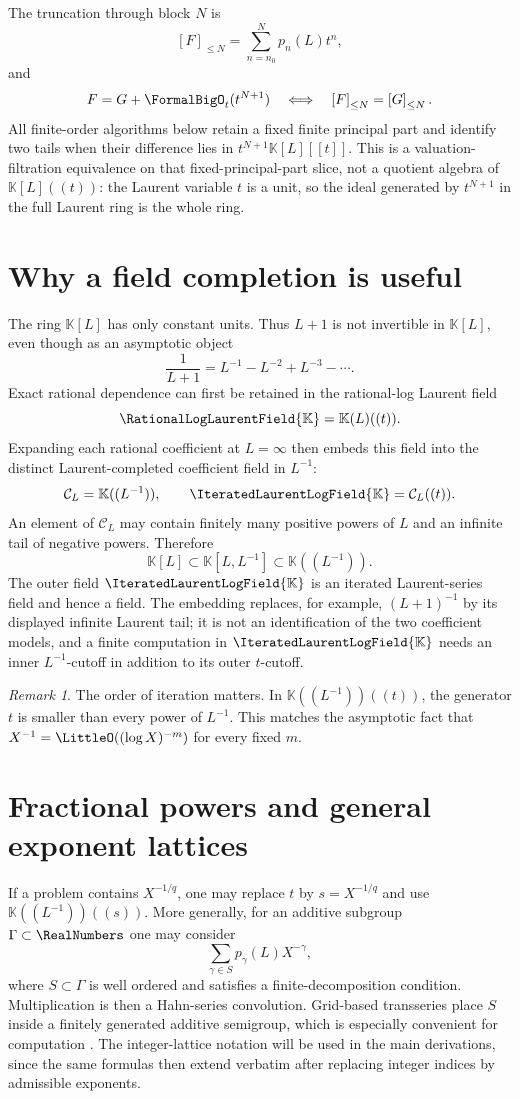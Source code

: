 \documentclass[11pt,oneside]{book}
\theoremstyle{definition}
\theoremstyle{remark}
\newtheorem{remark}[theorem]{Remark}
\newcommand{\K}{\mathbb K}
\newcommand{\PLfield}{\IteratedLaurentLogField{\K}}
\newcommand{\trunc}[2]{\left[#1\right]_{\le #2}}
\begin{document}
The truncation through block $N$ is
\[
 \trunc{F}{N}=\sum_{n=n_0}^{N}p_n(L)t^n,
\]
and
\[
 F=G+\FormalBigO_t(t^{N+1})
 \quad\Longleftrightarrow\quad
 \trunc{F}{N}=\trunc{G}{N}.
\]
All finite-order algorithms below retain a fixed finite principal part and identify
two tails when their difference lies in
\(t^{N+1}\K[L][[t]]\).  This is a valuation-filtration equivalence on that
fixed-principal-part slice, not a quotient algebra of \(\K[L]((t))\): the Laurent
variable \(t\) is a unit, so the ideal generated by \(t^{N+1}\) in the full Laurent
ring is the whole ring.

\section{Why a field completion is useful}
The ring $\K[L]$ has only constant units.  Thus $L+1$ is not invertible in
$\K[L]$, even though as an asymptotic object
\[
 \frac{1}{L+1}=L^{-1}-L^{-2}+L^{-3}-\cdots.
\]
Exact rational dependence can first be retained in the rational-log Laurent
field
\[
 \RationalLogLaurentField{\K}=\K(L)((t)).
\]
Expanding each rational coefficient at \(L=\infty\) then embeds this field into
the distinct Laurent-completed coefficient field in \(L^{-1}\):
\begin{equation}\label{eq:PL-field-def}
 \mathcal C_L=\K((L^{-1})),
 \qquad
 \PLfield=\mathcal C_L((t)).
\end{equation}
An element of $\mathcal C_L$ may contain finitely many positive powers of $L$
and an infinite tail of negative powers.  Therefore
\[
 \K[L]\subset\K[L,L^{-1}]\subset\K((L^{-1})).
\]
The outer field $\PLfield$ is an iterated Laurent-series field and hence a
field.  The embedding replaces, for example, \((L+1)^{-1}\) by its displayed
infinite Laurent tail; it is not an identification of the two coefficient
models, and a finite computation in \(\PLfield\) needs an inner
\(L^{-1}\)-cutoff in addition to its outer \(t\)-cutoff.

\begin{remark}
The order of iteration matters.  In $\K((L^{-1}))((t))$, the generator $t$ is
smaller than every power of $L^{-1}$.  This matches the asymptotic fact that
$X^{-1}=\LittleO((\log X)^{-m})$ for every fixed $m$.
\end{remark}

\section{Fractional powers and general exponent lattices}
If a problem contains $X^{-1/q}$, one may replace $t$ by $s=X^{-1/q}$ and use
$\K((L^{-1}))((s))$.  More generally, for an additive subgroup
$\Gamma\subset\RealNumbers$ one may consider
\[
 \sum_{\gamma\in S}p_\gamma(L)X^{-\gamma},
\]
where $S\subset\Gamma$ is well ordered and satisfies a finite-decomposition
condition.  Multiplication is then a Hahn-series convolution.  Grid-based
transseries place $S$ inside a finitely generated additive semigroup, which is
especially convenient for computation \cite{EdgarBeginners,EdgarComposition}.
The integer-lattice notation will be used in the main derivations, since the
same formulas then extend verbatim after replacing integer indices by
admissible exponents.
\end{document}
